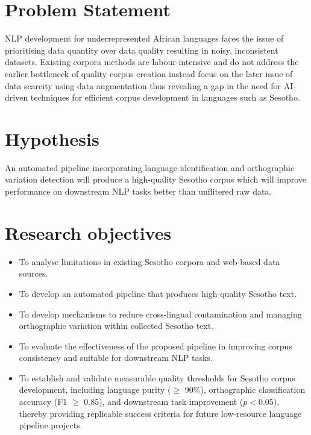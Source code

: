 \documentclass[11pt,a4paper]{article}
\begin{document}
\section{Problem Statement}
NLP development for underrepresented African languages faces the issue of prioritising data quantity over data quality resulting in noisy, inconsistent datasets. Existing corpora methods are labour-intensive and do not address the earlier bottleneck of quality corpus creation instead focus on the later issue of data scarcity using data augmentation thus revealing a gap in the need for AI-driven techniques for efficient corpus development in languages such as Sesotho.

\section{Hypothesis}
An automated pipeline incorporating language identification and orthographic variation detection will produce a high-quality Sesotho corpus which will improve performance on downstream NLP tasks better than unflitered raw data.
\vspace{1em}
\section{Research objectives}
\begin{itemize}
        \item  To analyse limitations in existing Sesotho corpora and web-based data sources.
       \item 	To develop an automated pipeline that produces high-quality Sesotho text.
       \item To develop mechanisms to reduce cross-lingual contamination and managing orthographic variation within collected Sesotho text.
       \item To evaluate the effectiveness of the proposed pipeline in improving corpus consistency and suitable for downstream NLP tasks. 
       \item To establish and validate measurable quality thresholds for Sesotho corpus development, including language purity ($\geq$ 90\%), orthographic classification accuracy (F1 $\geq$ 0.85), and downstream task improvement ($p < 0.05$), thereby providing replicable success criteria for future low-resource language pipeline projects.
\end{itemize}
\vspace{1em}
\end{document}
